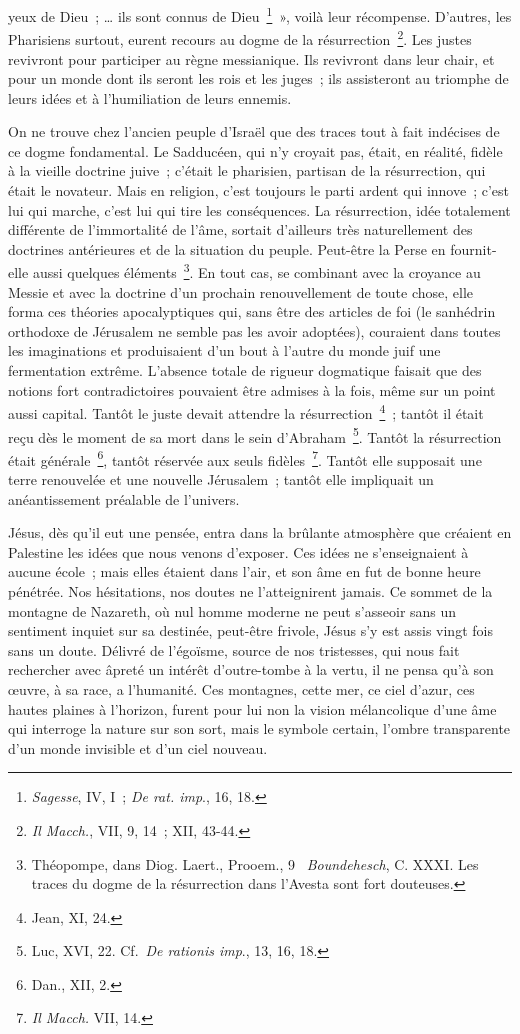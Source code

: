 \documentclass[french,twoside]{book} %
\begin{document}
yeux de Dieu ; … ils sont connus de Dieu \footnote{{\itshape Sagesse}, IV, I ; {\itshape De rat. imp}., 16, 18.} », voilà leur récompense. D’autres, les Pharisiens surtout, eurent recours au dogme de la résurrection \footnote{{\itshape Il Macch.}, VII, 9, 14 ; XII, 43-44.}. Les justes revivront pour participer au règne messianique. Ils revivront dans leur chair, et pour un monde dont ils seront les rois et les juges ; ils assisteront au triomphe de leurs idées et à l’humiliation de leurs ennemis.\par
On ne trouve chez l’ancien peuple d’Israël que des traces tout à fait indécises de ce dogme fondamental. Le Sadducéen, qui n’y croyait pas, était, en réalité, fidèle à la vieille doctrine juive ; c’était le pharisien, partisan de la résurrection, qui était le novateur. Mais en religion, c’est toujours le parti ardent qui innove ; c’est lui qui marche, c’est lui qui tire les conséquences. La résurrection, idée totalement différente de l’immortalité de l’âme, sortait d’ailleurs très naturellement des doctrines antérieures et de la situation du peuple. Peut-être la Perse en fournit-elle aussi quelques éléments \footnote{ Théopompe, dans Diog. Laert., Prooem., 9  {\itshape Boundehesch}, C. XXXI. Les traces du dogme de la résurrection dans l’Avesta sont fort douteuses.}. En tout cas, se combinant avec la croyance au Messie et avec la doctrine d’un prochain renouvellement de toute chose, elle forma ces théories apocalyptiques qui, sans être des articles de foi (le sanhédrin orthodoxe de Jérusalem ne semble pas les avoir adoptées), couraient dans toutes les imaginations et produisaient d’un bout à l’autre du monde juif une fermentation extrême. L’absence totale de rigueur dogmatique faisait que des notions fort contradictoires pouvaient être admises à la fois, même sur un point aussi capital. Tantôt le juste devait attendre la résurrection \footnote{Jean, XI, 24.} ; tantôt il était reçu dès le moment de sa mort dans le sein d’Abraham \footnote{ Luc, XVI, 22. Cf. {\itshape De rationis imp}., 13, 16, 18.}. Tantôt la résurrection était générale \footnote{Dan., XII, 2.}, tantôt réservée aux seuls fidèles \footnote{{\itshape Il Macch.} VII, 14.}. Tantôt elle supposait une terre renouvelée et une nouvelle Jérusalem ; tantôt elle impliquait un anéantissement préalable de l’univers.\par
Jésus, dès qu’il eut une pensée, entra dans la brûlante atmosphère que créaient en Palestine les idées que nous venons d’exposer. Ces idées ne s’enseignaient à aucune école ; mais elles étaient dans l’air, et son âme en fut de bonne heure pénétrée. Nos hésitations, nos doutes ne l’atteignirent jamais. Ce sommet de la montagne de Nazareth, où nul homme moderne ne peut s’asseoir sans un sentiment inquiet sur sa destinée, peut-être frivole, Jésus s’y est assis vingt fois sans un doute. Délivré de l’égoïsme, source de nos tristesses, qui nous fait rechercher avec âpreté un intérêt d’outre-tombe à la vertu, il ne pensa qu’à son œuvre, à sa race, a l’humanité. Ces montagnes, cette mer, ce ciel d’azur, ces hautes plaines à l’horizon, furent pour lui non la vision mélancolique d’une âme qui interroge la nature sur son sort, mais le symbole certain, l’ombre transparente d’un monde invisible et d’un ciel nouveau.\par
\end{document}
